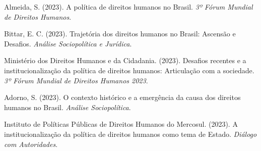 \documentclass[
   article,       
   12pt,          
   oneside,       
   a4paper,       
   english,       
   brazil,        
   sumario=tradicional
   ]{abntex2}
\begin{document}
\newpage


\begin{thebibliography}{}
\newpage

Almeida, S. (2023). A política de direitos humanos no Brasil. \textit{3º Fórum Mundial de Direitos Humanos}.

Bittar, E. C. (2023). Trajetória dos direitos humanos no Brasil: Ascensão e Desafios. \textit{Análise Sociopolítica e Jurídica}.

Ministério dos Direitos Humanos e da Cidadania. (2023). Desafios recentes e a institucionalização da política de direitos humanos: Articulação com a sociedade. \textit{3º Fórum Mundial de Direitos Humanos 2023}.

Adorno, S. (2023). O contexto histórico e a emergência da causa dos direitos humanos no Brasil. \textit{Análise Sociopolítica}.

Instituto de Políticas Públicas de Direitos Humanos do Mercosul. (2023). A institucionalização da política de direitos humanos como tema de Estado. \textit{Diálogo com Autoridades}.

\end{thebibliography}
\end{document}
